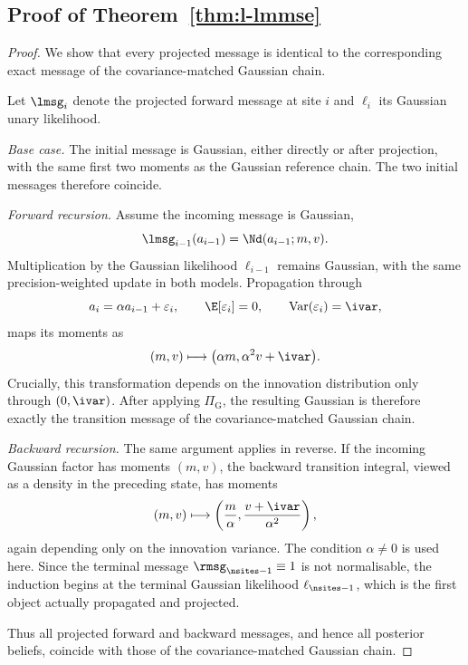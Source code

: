 \subsection{Proof of Theorem~\ref{thm:l-lmmse}}
\label{sec:lmmse-proof}

\begin{proof}
We show that every projected message is identical to the corresponding exact
message of the covariance-matched Gaussian chain.

Let $\lmsg_i$ denote the projected forward message at site $i$ and $\ell_i$
its Gaussian unary likelihood.

\emph{Base case.}
The initial message is Gaussian, either directly or after projection, with the
same first two moments as the Gaussian reference chain. The two initial
messages therefore coincide.

\emph{Forward recursion.}
Assume the incoming message is Gaussian,
\[
  \lmsg_{i-1}(a_{i-1})=\Nd(a_{i-1};m,v).
\]
Multiplication by the Gaussian likelihood $\ell_{i-1}$ remains Gaussian, with
the same precision-weighted update in both models. Propagation through
\[
  a_i=\alpha a_{i-1}+\varepsilon_i,
  \qquad
  \E[\varepsilon_i]=0,
  \qquad
  \operatorname{Var}(\varepsilon_i)=\ivar,
\]
maps its moments as
\begin{equation}
  (m,v)
  \longmapsto
  \bigl(\alpha m,\alpha^2v+\ivar\bigr).
  \label{eq:lmmse-fwd-map}
\end{equation}
Crucially, this transformation depends on the innovation distribution only
through $(0,\ivar)$. After applying $\Pi_{\mathrm G}$, the resulting Gaussian
is therefore exactly the transition message of the covariance-matched
Gaussian chain.

\emph{Backward recursion.}
The same argument applies in reverse. If the incoming Gaussian factor has
moments $(m,v)$, the backward transition integral, viewed as a density in the
preceding state, has moments
\begin{equation}
  (m,v)
  \longmapsto
  \left(\frac{m}{\alpha},
        \frac{v+\ivar}{\alpha^2}\right),
  \label{eq:lmmse-bwd-map}
\end{equation}
again depending only on the innovation variance. The condition
$\alpha\neq0$ is used here. Since the terminal message
$\rmsg_{\nsites-1}\equiv1$ is not normalisable, the induction begins at the
terminal Gaussian likelihood $\ell_{\nsites-1}$, which is the first object
actually propagated and projected.

Thus all projected forward and backward messages, and hence all posterior
beliefs, coincide with those of the covariance-matched Gaussian chain.


\end{proof}
